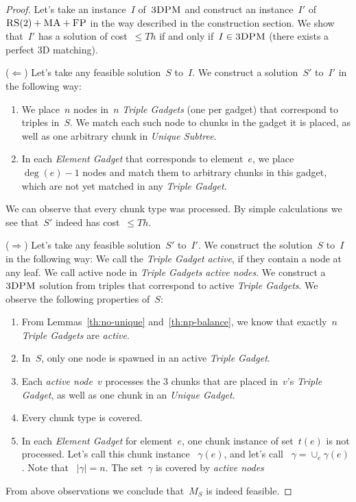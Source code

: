 \documentclass[preprint,12pt]{elsarticle}
\newcommand{\FP}{\textsc{FP}}
\newcommand{\RS}{\textsc{RS}}
\newcommand{\MA}{\textsc{MA}}
\newcommand{\TDPM}{\textsc{3DPM}}
\newcommand{\Unmatched}{\gamma}
\newcommand{\ActiveNode}{\textit{active node}}
\newcommand{\ActiveNodes}{\textit{active nodes}}
\newcommand{\Solution}{S}
\newcommand{\UnqSubtree}{{{\emph{Unique Subtree}}}}
\newcommand{\TripleGadget}{{\emph{Triple Gadget}}}
\newcommand{\TripleGadgets}{{\emph{Triple Gadgets}}}
\newcommand{\UnqGadget}{{\emph{Unique Gadget}}}
\newcommand{\ElGadget}{{\emph{Element Gadget}}}
\newcommand{\Thr}{\ensuremath{Th}}
\newcommand{\Sol}{\ensuremath{S}}
\begin{document}
\begin{proof}
  
  Let's take an instance~$I$ of~$\TDPM$ and construct an instance~$I'$
  of~$\RS(2)+\MA+\FP$ in the way described in the construction section.  We show that~$I'$
  has a solution of cost~$\leq \Thr$ if and only if~$I \in \TDPM$ (there
  exists a perfect 3D matching).

  ($\Leftarrow$) Let's take any feasible solution~$\Sol$ to~$I$. We
  construct a solution~$\Sol'$ to~$I'$ in the following way:
  \begin{enumerate}
    \item We place~$n$ nodes in~$n$ {\TripleGadgets} (one per gadget)
    that correspond to triples in~$\Sol$. We match each such node
    to chunks in the gadget it is placed, as well as one arbitrary
    chunk in {\UnqSubtree}.
    \item In each {\ElGadget} that corresponds to element~$e$, we place
   ~$\deg(e) - 1$ nodes and match them to arbitrary chunks in this
    gadget, which are not yet matched in any {\TripleGadget}.
  \end{enumerate}

  We can observe that every chunk type was processed. By simple
  calculations we see that~$\Sol'$ indeed has cost~$\leq \Thr$.

  ($\Rightarrow$) Let's take any feasible solution~$\Sol'$ to~$I'$.
  We construct the solution~$\Sol$ to~$I$ in the following way:
  We call the {\TripleGadget} \textit{active}, if they contain a node
  at any leaf. We call active node in
  {\TripleGadgets} \ActiveNodes. We construct a~$\TDPM$ solution from
  triples that correspond to active \TripleGadgets.
  We observe the following properties of~$\Solution$:
  \begin{enumerate}
    \item From Lemmas~\ref{th:no-unique} and~\ref{th:np-balance}, we
    know that exactly~$n$ {\TripleGadgets} are \emph{active}.
    \item In~$\Solution$, only one node is spawned in an active
    \TripleGadget.
    \item Each {\ActiveNode}~$v$ processes the 3 chunks that are
    placed in~$v$'s \TripleGadget, as well as one chunk in an \UnqGadget.
    \item Every chunk type is covered.
    \item In each {\ElGadget} for element~$e$, one chunk instance of
    set~$t(e)$ is not processed. Let's call this chunk instance
   ~$\Unmatched(e)$, and let's call
   ~$\Unmatched = \cup_e \Unmatched(e)$. Note that 
   ~$|\Unmatched| = n$.
    The set~$\Unmatched$ is covered by \ActiveNodes
  \end{enumerate}

  From above observations we conclude that~$M_S$ is indeed feasible.
\end{proof}
\end{document}
